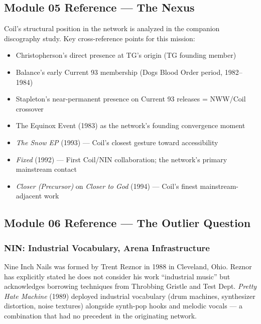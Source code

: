 \documentclass[11pt,letterpaper]{article}
\begin{document}
\subsection{Module 05 Reference --- The Nexus}

Coil's structural position in the network is analyzed in the companion discography study.
Key cross-reference points for this mission:

\begin{itemize}[noitemsep]
  \item Christopherson's direct presence at TG's origin (TG founding member)
  \item Balance's early Current 93 membership (Dogs Blood Order period, 1982--1984)
  \item Stapleton's near-permanent presence on Current 93 releases = NWW/Coil crossover
  \item The Equinox Event (1983) as the network's founding convergence moment
  \item \textit{The Snow EP} (1993) — Coil's closest gesture toward accessibility
  \item \textit{Fixed} (1992) — First Coil/NIN collaboration; the network's primary mainstream contact
  \item \textit{Closer (Precursor)} on \textit{Closer to God} (1994) — Coil's finest mainstream-adjacent work
\end{itemize}

\subsection{Module 06 Reference --- The Outlier Question}

\subsubsection{NIN: Industrial Vocabulary, Arena Infrastructure}

Nine Inch Nails was formed by Trent Reznor in 1988 in Cleveland, Ohio. Reznor has explicitly
stated he does not consider his work ``industrial music'' but acknowledges borrowing techniques
from Throbbing Gristle and Test Dept. \textit{Pretty Hate Machine} (1989) deployed industrial
vocabulary (drum machines, synthesizer distortion, noise textures) alongside synth-pop hooks
and melodic vocals — a combination that had no precedent in the originating network.
\end{document}
